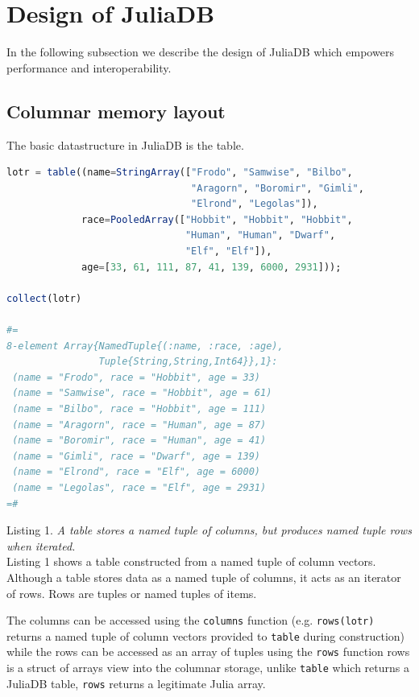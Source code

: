 \documentclass{juliacon}
\begin{document}
\section{Design of JuliaDB}

In the following subsection we describe the design of JuliaDB which empowers performance and interoperability.

\subsection{Columnar memory layout}
The basic datastructure in JuliaDB is the table.

\begin{lstlisting}[language=Julia]
lotr = table((name=StringArray(["Frodo", "Samwise", "Bilbo",
                                "Aragorn", "Boromir", "Gimli",
                                "Elrond", "Legolas"]),
             race=PooledArray(["Hobbit", "Hobbit", "Hobbit",
                               "Human", "Human", "Dwarf",
                               "Elf", "Elf"]),
             age=[33, 61, 111, 87, 41, 139, 6000, 2931]));

collect(lotr)

#=
8-element Array{NamedTuple{(:name, :race, :age),
                Tuple{String,String,Int64}},1}:
 (name = "Frodo", race = "Hobbit", age = 33)  
 (name = "Samwise", race = "Hobbit", age = 61)
 (name = "Bilbo", race = "Hobbit", age = 111) 
 (name = "Aragorn", race = "Human", age = 87) 
 (name = "Boromir", race = "Human", age = 41) 
 (name = "Gimli", race = "Dwarf", age = 139)  
 (name = "Elrond", race = "Elf", age = 6000)  
 (name = "Legolas", race = "Elf", age = 2931) 
=#
\end{lstlisting}
Listing 1. \emph{A table stores a named tuple of columns, but produces named tuple rows when iterated.}\\

Listing 1 shows a table constructed from a named tuple of column vectors. Although a table stores data as a named tuple of columns, it acts as an iterator of rows. Rows are tuples or named tuples of items.

The columns can be accessed using the \texttt{columns} function (e.g. \texttt{rows(lotr)} returns a named tuple of column vectors provided to \texttt{table} during construction) while the rows can be accessed as an array of tuples using the \texttt{rows} function rows is a struct of arrays view into the columnar storage, unlike \texttt{table} which returns a JuliaDB table, \texttt{rows} returns a legitimate Julia array.
\end{document}
